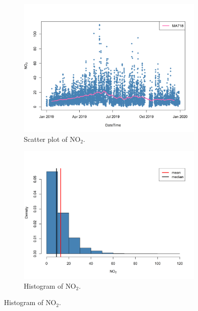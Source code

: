 \documentclass[a4paper, 10pt]{article}
\begin{document}
\begin{flushleft}
      \begin{figure}[H]
         \centering
         \begin{subfigure}[t]{0.48\linewidth}
            \centering
            \includegraphics[width=\linewidth]{../images/no2_scatter_2019.png}
            \caption{Scatter plot of $\text{NO}_{2}$.}
         \end{subfigure}
         \hfill
         \begin{subfigure}[t]{0.48\linewidth}
            \centering
            \includegraphics[width=\linewidth]{../images/no2_hist_2019.png}
            \caption{Histogram of $\text{NO}_{2}$.}
         \end{subfigure}
      \end{figure}


\end{flushleft}
\end{document}
